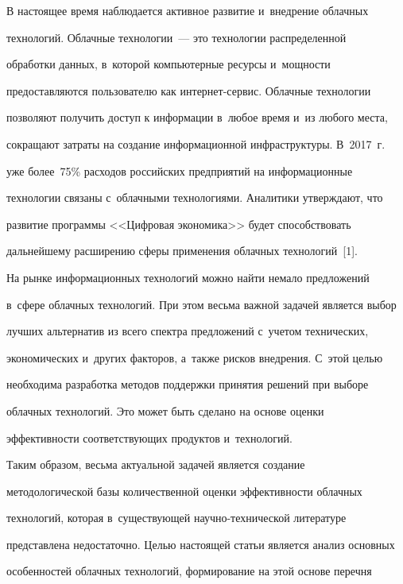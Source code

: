 \vspace*{-3pt}

      

  В настоящее время наблюдается активное развитие и~внедрение облачных 

технологий. Облачные технологии~--- это технологии распределенной 

обработки данных, в~которой компьютерные ресурсы и~мощности 

предоставляются пользователю как ин\-тер\-нет-сер\-вис. Облачные технологии 

позволяют получить доступ к информации в~любое время и~из любого места, 

сокращают затраты на создание информационной инфраструктуры. В~2017~г.\ 

уже более~75\% расходов российских предприятий на информационные 

технологии связаны с~облачными технологиями. Аналитики утверждают, что 

развитие программы <<Цифровая экономика>> будет способствовать 

дальнейшему расширению сферы применения облачных технологий~[1].

  

  На рынке информационных технологий можно найти немало предложений 

  в~сфере облачных технологий. При этом весьма важной задачей является выбор 

лучших альтернатив из всего спектра предложений с~учетом технических, 

экономических и~других факторов, а~также рисков внедрения. С~этой \mbox{целью} 

необходима разработка методов поддержки принятия решений при выборе 

облачных технологий. Это может быть сделано на основе оценки 

эффективности соответствующих продуктов и~технологий. 

  

  Таким образом, весьма актуальной задачей является создание 

методологической базы количественной оценки эффективности облачных 

технологий, которая в~существующей на\-уч\-но-тех\-ни\-че\-ской литературе 

представлена недостаточно. Целью настоящей статьи является анализ основных 

особенностей облачных технологий, формирование на этой основе перечня 

